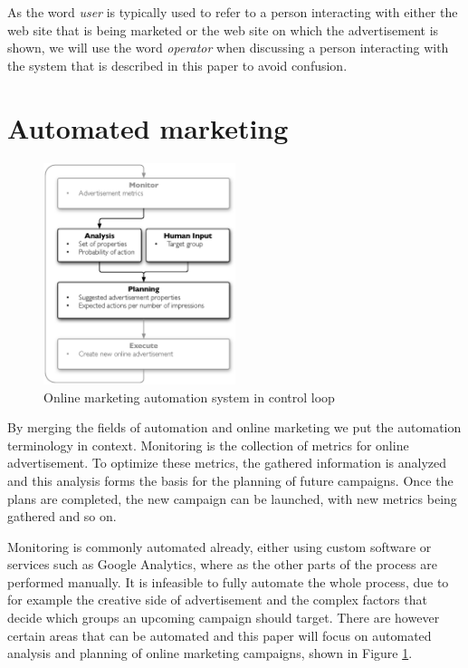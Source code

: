 \documentclass[11pt,a4paper]{report}
\begin{document}
As the word \emph{user} is typically used to refer to a person interacting with either the web site that is being marketed or the web site on which the advertisement is shown, we will use the word \emph{operator} when discussing a person interacting with the system that is described in this paper to avoid confusion.

\section{Automated marketing}
\begin{figure}[htb] \centering \includegraphics[width=0.5\textwidth]{mape-marketing.eps}
	\caption{Online marketing automation system in control loop}
	\label{fig:MAPEMarketing}
\end{figure}

By merging the fields of automation and online marketing we put the automation terminology in context. Monitoring is the collection of metrics for online advertisement. To optimize these metrics, the gathered information is analyzed and this analysis forms the basis for the planning of future campaigns. Once the plans are completed, the new campaign can be launched, with new metrics being gathered and so on.

Monitoring is commonly automated already, either using custom software or services such as Google Analytics, where as the other parts of the process are performed manually. It is infeasible to fully automate the whole process, due to for example the creative side of advertisement and the complex factors that decide which groups an upcoming campaign should target. There are however certain areas that can be automated and this paper will focus on automated analysis and planning of online marketing campaigns, shown in Figure \ref{fig:MAPEMarketing}.
\end{document}
